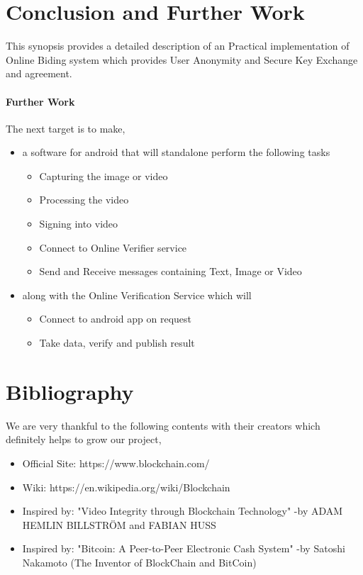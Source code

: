 \documentclass[a4paper,12pt]{report}
\begin{document}
\afterpage{\null\newpage}

\chapter{Conclusion and Further Work}
\label{Ch6} This synopsis provides a detailed description of an
Practical implementation of Online Biding system which provides
User Anonymity and Secure Key Exchange and agreement.

\subsubsection{Further Work}
The next target is to make,
\begin{itemize}
\item a software for android that will standalone perform the following tasks
\begin{itemize}
\item Capturing the image or video
\item Processing the video
\item Signing into video
\item Connect to Online Verifier service
\item Send and Receive messages containing Text, Image or Video
\end{itemize}
\item along with the Online Verification Service which will
\begin{itemize}
\item Connect to android app on request
\item Take data, verify and publish result
\end{itemize}
\end{itemize}

\chapter{Bibliography}
We are very thankful to the following contents with their creators which definitely helps to grow our project,
\begin{itemize}
\item Official Site: https://www.blockchain.com/
\item Wiki: https://en.wikipedia.org/wiki/Blockchain
\item Inspired by: "Video Integrity through Blockchain Technology" -by ADAM HEMLIN BILLSTRÖM and FABIAN HUSS
\item Inspired by: "Bitcoin: A Peer-to-Peer Electronic Cash System" -by Satoshi Nakamoto (The Inventor of BlockChain and BitCoin)
\end{itemize}
\end{document}
